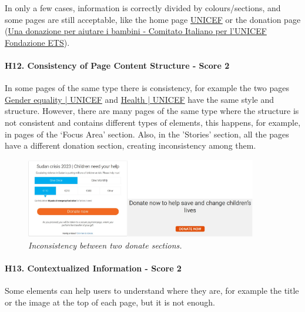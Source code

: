 \newline In only a few cases, information is correctly divided by colours/sections, and some pages are still acceptable, like the home page \href{https://www.unicef.org/}{UNICEF} or the donation page (\href{https://donazioni.unicef.it}{Una donazione per aiutare i bambini - Comitato Italiano per l'UNICEF Fondazione ETS}).
\newline
\newline \paragraph{H12. Consistency of Page Content Structure - Score 2}  \label{subsec:H12}	In some pages of the same type there is consistency, for example the two pages \href{https://www.unicef.org/gender-equality}{Gender equality | UNICEF} and \href{https://www.unicef.org/health}{Health | UNICEF} have the same style and structure.
\newline However, there are many pages of the same type where the structure is not consistent and contains different types of elements, this happens, for example, in pages of the ‘Focus Area’ section.
\newline Also, in the 'Stories' section, all the pages have a different donation section, creating inconsistency among them.
\begin{figure}[!h]
	\begin{center}
		\includegraphics[width=0.9\textwidth]{FinalScores16.jpg}
		\captionsetup{font=small}
		\caption{\textit{Inconsistency between two donate sections.}}
	\end{center}
\end{figure}
\newline
\newline \paragraph{H13. Contextualized Information - Score 2}  \label{subsec:H13}	Some elements can help users to understand where they are, for example the title or the image at the top of each page, but it is not enough.
